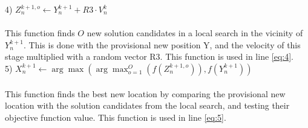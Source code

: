 \documentclass[runningheads]{llncs}
\begin{document}
4) $
Z_n^{k+1, o} \leftarrow Y_n^{k+1} + R3 \cdot V_n^{k}
$ \\ \\
This function finds $O$ new solution candidates in a local search in the vicinity of $Y_n^{k+1}$. This is done with the provisional new position Y, and the velocity of this stage multiplied with a random vector R3. This function is used in line \ref{eq:4}.\\

5) $
X_n^{k+1} \leftarrow \arg \max (\arg \max_{o=1}^O(f(Z_n^{k+1, o})),f(Y_n^{k+1}))
$ \\ \\
This function finds the best new location by comparing the provisional new location with the solution candidates from the local search, and testing their objective function value. This function is used in line \ref{eq:5}.



\newpage
\end{document}
